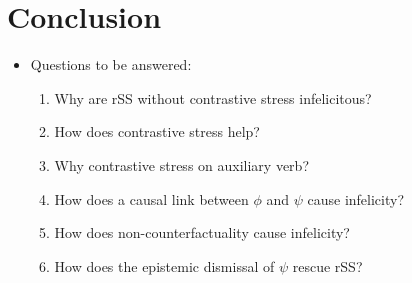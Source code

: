 \section{Conclusion}
\begin{frame}[t]
\sectionpage\vskip 18pt
    \begin{itemize}
        \item<1-> Questions to be answered:\vskip 18pt
            \begin{enumerate}
                \item Why are rSS without contrastive stress infelicitous? {\color{seeblau100!75!black}\checkmark}\vskip 9pt
                \item How does contrastive stress help? {\color{seeblau100!75!black}\checkmark}\vskip 9pt
                \item Why contrastive stress on auxiliary verb? {\color{seeblau100!75!black}\checkmark}\vskip 9pt
                \item How does a causal link between {\color{red}$\phi$} and {\color{Orange}$\psi$} cause infelicity? {\color{seeblau100!75!black}\checkmark}\vskip 9pt
                \item How does non-counterfactuality cause infelicity? {\color{seeblau100!75!black}\checkmark}\vskip 9pt
                \item How does the epistemic dismissal of {\color{Orange}$\psi$} rescue rSS? {\color{seeblau100!75!black}\checkmark}
            \end{enumerate}
	\end{itemize}
\end{frame}

